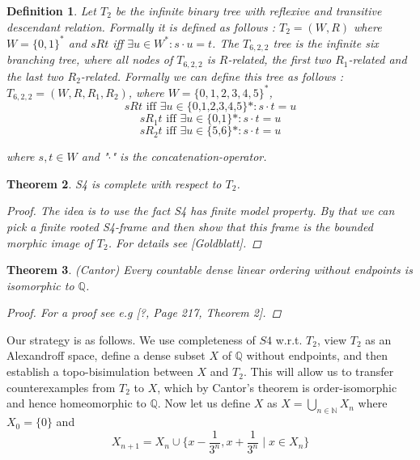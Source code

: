 \documentclass[12pt, a4paper]{scrartcl}
\newtheorem{definition}{Definition}[subsection]
\newtheorem{theorem}[definition]{Theorem}
\begin{document}
\begin{definition}
    Let $T_2$ be the infinite binary tree with reflexive and transitive descendant relation. \newline Formally it is defined as follows :
    $T_2 = (W,R)$ where $W = \{0,1\}^*$ and $sRt$ iff $\exists u\in W^* : s \cdot u = t$. \newline
    The $T_ {6,2,2}$ tree is the infinite six branching tree, where all nodes of $T_ {6,2,2}$ is $R$-related, the first two $R_1$-related 
    and the last two $R_2$-related. Formally we can define this tree as follows : $T_ {6,2,2} = (W,R,R_1,R_2)$,
    where $W = \{{0,1,2,3,4,5}\}^*$, $$sRt \mbox{ iff } \exists u \in \mbox{\{0,1,2,3,4,5\}*} : s \cdot t = u $$
    $$ sR_1t  \mbox{ iff } \exists u \in \mbox{\{0,1\}*} : s \cdot t = u$$
    $$ sR_2t  \mbox{ iff } \exists u \in \mbox{\{5,6\}*} : s \cdot t = u$$
    
    where $s,t \in W$ and "$\cdot$" is the concatenation-operator.        
\end{definition}

\begin{theorem}
    S4 is complete with respect to $T_2$.

    \begin{proof}
    The idea is to use the fact S4 has finite model property. By that we can pick a finite rooted S4-frame and then show that this frame is the bounded morphic image of $T_2$.
        For details see [Goldblatt].
    \end{proof}
\end{theorem}

\begin{theorem}

    (Cantor) Every countable dense linear ordering without endpoints is isomorphic to $\mathbb{Q}$.
    \begin{proof}
        For a proof see e.g [?, Page 217, Theorem 2].   
    \end{proof}

\end{theorem}

Our strategy is as follows. We use completeness of $S4$ w.r.t. $T_2$, view $T_2$ as an Alexandroff space, define a dense subset $X$ of $\mathbb{Q}$ without endpoints,
and then establish a topo-bisimulation between $X$ and $T_2$. This will allow us to transfer counterexamples from $T_2$ to $X$, which by Cantor's theorem
is order-isomorphic and hence homeomorphic to $\mathbb{Q}$. \newline 
Now let us define $X$ as $X = \bigcup_{n \in \mathbb{N}} X_n$ where $X_0 = \{0\}$ and 
$$X_{n+1} = X_n \cup \{x - \frac{1}{3^n}, x + \frac{1}{3^n} \mid x \in X_n\}$$
\end{document}
